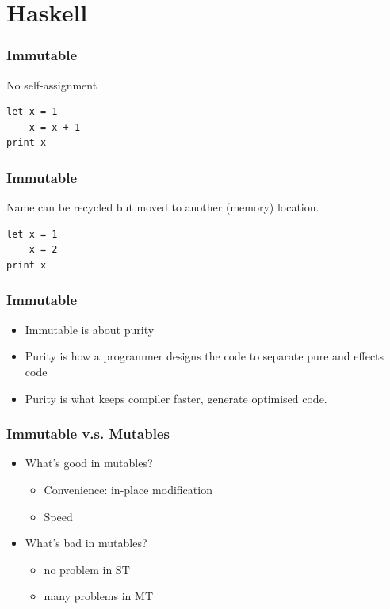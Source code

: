 \section{Haskell}

\begin{frame}[fragile]\frametitle{Immutable}

No self-assignment

\begin{verbatim}
let x = 1
    x = x + 1
print x
\end{verbatim}

\end{frame}

\begin{frame}[fragile]\frametitle{Immutable}

Name can be recycled but moved to another (memory) location.

\begin{verbatim}
let x = 1
    x = 2
print x
\end{verbatim}

\end{frame}

\begin{frame}\frametitle{Immutable}

\begin{itemize}
\item
  Immutable is about purity
\item
  Purity is how a programmer designs the code to separate pure and
  effects code
\item
  Purity is what keeps compiler faster, generate optimised code.
\end{itemize}

\end{frame}

\begin{frame}\frametitle{Immutable v.s. Mutables}

\begin{itemize}
\item
  What's good in mutables?

  \begin{itemize}
  \item
    Convenience: in-place modification
  \item
    Speed
  \end{itemize}
\item
  What's bad in mutables?

  \begin{itemize}
  \item
    no problem in ST
  \item
    many problems in MT
  \end{itemize}
\end{itemize}

\end{frame}

